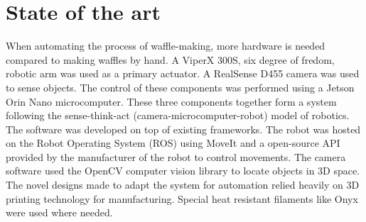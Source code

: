 \section{State of the art}

When automating the process of waffle-making, more hardware is needed compared to making waffles by hand. A ViperX 300S, six degree of fredom, robotic arm was used as a primary actuator. A RealSense D455 camera was used to sense objects. The control of these components was performed using a Jetson Orin Nano microcomputer. These three components together form a system following the sense-think-act (camera-microcomputer-robot) model of robotics. \\


The software was developed on top of existing frameworks. The robot was hosted on the Robot Operating System (ROS) using MoveIt and a open-source API provided by the manufacturer of the robot to control movements. The camera software used the OpenCV computer vision library to locate objects in 3D space. 
The novel designs made to adapt the system for automation relied heavily on 3D printing technology for manufacturing. Special heat resistant filaments like Onyx were used where needed. 

